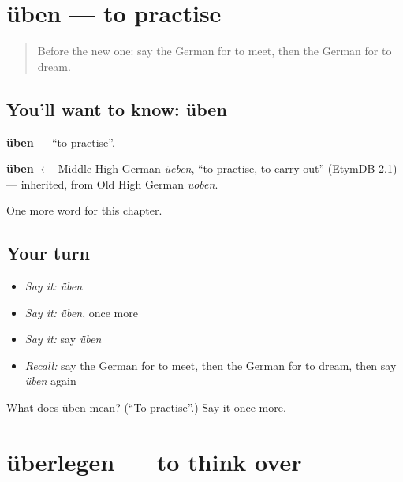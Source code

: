 \section[üben]{üben — to practise}

\label{lesson:GE-C151-ueben}



\begin{quote}
Before the new one: say the German for to meet, then the German for to dream.
\end{quote}

\subsection*{You'll want to know: üben}
\textbf{üben} — \textquotedblleft{}to practise\textquotedblright{}.

\begin{cousinweb}
\textbf{üben} $\leftarrow$ Middle High German \emph{üeben}, \textquotedblleft{}to practise, to carry out\textquotedblright{} (EtymDB 2.1) — inherited, from Old High German \emph{uoben}.
\end{cousinweb}

\begin{grammarlens}[title={What you've built}]
One more word for this chapter.
\end{grammarlens}

\subsection*{Your turn}
\begin{itemize}
\raggedright
  \item \emph{Say it:} \emph{üben}
  \item \emph{Say it:} \emph{üben}, once more
  \item \emph{Say it:} say \emph{üben}
  \item \emph{Recall:} say the German for to meet, then the German for to dream, then say \emph{üben} again
\end{itemize}

\begin{tcolorbox}[breakable,colback=teal!4,colframe=teal!35!black,title={Before you move on}]
What does üben mean? (\textquotedblleft{}To practise\textquotedblright{}.) Say it once more.
\end{tcolorbox}
\section[überlegen]{überlegen — to think over}

